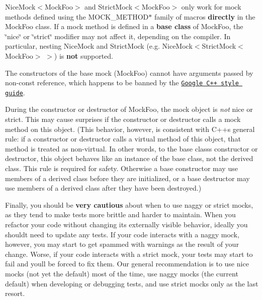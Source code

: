 \begin{DoxyEnumerate}
\item {\ttfamily Nice\+Mock$<$Mock\+Foo$>$} and {\ttfamily Strict\+Mock$<$Mock\+Foo$>$} only work for mock methods defined using the {\ttfamily M\+O\+C\+K\+\_\+\+M\+E\+T\+H\+O\+D$\ast$} family of macros {\bfseries directly} in the {\ttfamily Mock\+Foo} class. If a mock method is defined in a {\bfseries base class} of {\ttfamily Mock\+Foo}, the \char`\"{}nice\char`\"{} or \char`\"{}strict\char`\"{} modifier may not affect it, depending on the compiler. In particular, nesting {\ttfamily Nice\+Mock} and {\ttfamily Strict\+Mock} (e.\+g. {\ttfamily Nice\+Mock$<$Strict\+Mock$<$Mock\+Foo$>$ $>$}) is {\bfseries not} supported.
\end{DoxyEnumerate}
\begin{DoxyEnumerate}
\item The constructors of the base mock ({\ttfamily Mock\+Foo}) cannot have arguments passed by non-\/const reference, which happens to be banned by the \href{https://google.github.io/styleguide/cppguide.html}{\tt Google C++ style guide}.
\end{DoxyEnumerate}
\begin{DoxyEnumerate}
\item During the constructor or destructor of {\ttfamily Mock\+Foo}, the mock object is {\itshape not} nice or strict. This may cause surprises if the constructor or destructor calls a mock method on {\ttfamily this} object. (This behavior, however, is consistent with C++\textquotesingle{}s general rule\+: if a constructor or destructor calls a virtual method of {\ttfamily this} object, that method is treated as non-\/virtual. In other words, to the base class\textquotesingle{}s constructor or destructor, {\ttfamily this} object behaves like an instance of the base class, not the derived class. This rule is required for safety. Otherwise a base constructor may use members of a derived class before they are initialized, or a base destructor may use members of a derived class after they have been destroyed.)
\end{DoxyEnumerate}

Finally, you should be {\bfseries very cautious} about when to use naggy or strict mocks, as they tend to make tests more brittle and harder to maintain. When you refactor your code without changing its externally visible behavior, ideally you should\textquotesingle{}t need to update any tests. If your code interacts with a naggy mock, however, you may start to get spammed with warnings as the result of your change. Worse, if your code interacts with a strict mock, your tests may start to fail and you\textquotesingle{}ll be forced to fix them. Our general recommendation is to use nice mocks (not yet the default) most of the time, use naggy mocks (the current default) when developing or debugging tests, and use strict mocks only as the last resort.

